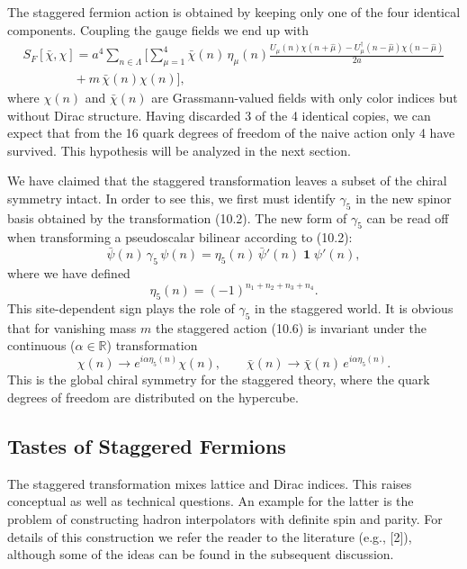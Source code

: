 The staggered fermion action is obtained by keeping only one of the four
identical components. Coupling the gauge fields we end up with
\begin{multline}
  S_F[\bar\chi, \chi] = a^4 \sum_{n\in\Lambda}
  \Bigg[
    \sum_{\mu=1}^{4} \bar\chi(n)\, \eta_\mu(n)
    \frac{U_\mu(n)\chi(n+\hat\mu) - U_\mu^{\dagger}(n-\hat\mu)\chi(n-\hat\mu)}{2a}
  \\
  \qquad\qquad + m\,\bar\chi(n)\chi(n)
  \Bigg] ,
\end{multline}
where $\chi(n)$ and $\bar\chi(n)$ are Grassmann-valued fields with only color
indices but without Dirac structure. Having discarded 3 of the 4 identical
copies, we can expect that from the 16 quark degrees of freedom of the naive
action only 4 have survived. This hypothesis will be analyzed in the next
section.

We have claimed that the staggered transformation leaves a subset of the
chiral symmetry intact. In order to see this, we first must identify
$\gamma_5$ in the new spinor basis obtained by the transformation (10.2). The
new form of $\gamma_5$ can be read off when transforming a pseudoscalar
bilinear according to (10.2):
\begin{equation}
  \bar\psi(n)\, \gamma_5\, \psi(n) = \eta_5(n)\,
  \bar\psi'(n)\; \mathbf{1} \; \psi'(n) ,
\end{equation}
where we have defined
\begin{equation}
  \eta_5(n) = (-1)^{n_1 + n_2 + n_3 + n_4} .
\end{equation}
This site-dependent sign plays the role of $\gamma_5$ in the staggered world.
It is obvious that for vanishing mass $m$ the staggered action (10.6) is
invariant under the continuous ($\alpha \in \mathbb{R}$) transformation
\begin{equation}
  \chi(n) \longrightarrow e^{i\alpha\eta_5(n)}\chi(n) , \qquad
  \bar\chi(n) \longrightarrow \bar\chi(n)\, e^{i\alpha\eta_5(n)} .
\end{equation}
This is the global chiral symmetry for the staggered theory, where the quark
degrees of freedom are distributed on the hypercube.

\subsection{Tastes of Staggered Fermions}

The staggered transformation mixes lattice and Dirac indices. This raises
conceptual as well as technical questions. An example for the latter is the
problem of constructing hadron interpolators with definite spin and parity.
For details of this construction we refer the reader to the literature (e.g.,
[2]), although some of the ideas can be found in the subsequent discussion.

